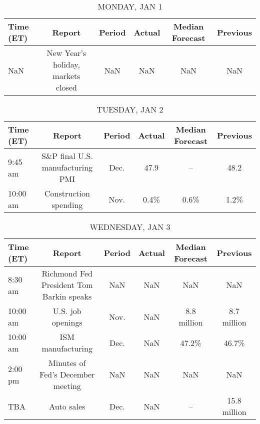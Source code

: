 \documentclass{article}%
\begin{document}
%
\normalsize%


\begin{table}[htbp]%
\caption{MONDAY, JAN 1}%
\centering%
\begin{adjustbox}{width=1\textwidth}%
\begin{tabular}{lccccc}
\toprule
Time (ET) &                             Report & Period & Actual & Median Forecast & Previous \\
\midrule
      NaN & New Year's holiday, markets closed &    NaN &    NaN &             NaN &      NaN \\
\bottomrule
\end{tabular}
%
\end{adjustbox}%
\end{table}

%


\begin{table}[htbp]%
\caption{TUESDAY, JAN 2}%
\centering%
\begin{adjustbox}{width=1\textwidth}%
\begin{tabular}{lccccc}
\toprule
Time (ET) &                           Report & Period & Actual & Median Forecast & Previous \\
\midrule
  9:45 am & S\&P final U.S. manufacturing PMI &   Dec. &   47.9 &              -- &     48.2 \\
 10:00 am &            Construction spending &   Nov. &   0.4\% &            0.6\% &     1.2\% \\
\bottomrule
\end{tabular}
%
\end{adjustbox}%
\end{table}

%


\begin{table}[htbp]%
\caption{WEDNESDAY, JAN 3}%
\centering%
\begin{adjustbox}{width=1\textwidth}%
\begin{tabular}{lccccc}
\toprule
Time (ET) &                                   Report & Period & Actual & Median Forecast &     Previous \\
\midrule
  8:30 am & Richmond Fed President Tom Barkin speaks &    NaN &    NaN &             NaN &          NaN \\
 10:00 am &                        U.S. job openings &   Nov. &    NaN &     8.8 million &  8.7 million \\
 10:00 am &                        ISM manufacturing &   Dec. &    NaN &           47.2\% &        46.7\% \\
  2:00 pm &        Minutes of Fed's December meeting &    NaN &    NaN &             NaN &          NaN \\
      TBA &                               Auto sales &   Dec. &    NaN &              -- & 15.8 million \\
\bottomrule
\end{tabular}
%
\end{adjustbox}%
\end{table}
\end{document}
